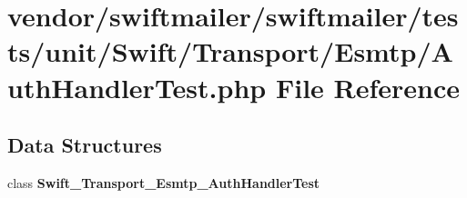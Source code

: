 \section{vendor/swiftmailer/swiftmailer/tests/unit/\+Swift/\+Transport/\+Esmtp/\+Auth\+Handler\+Test.php File Reference}
\label{_auth_handler_test_8php}
\subsection*{Data Structures}
\begin{DoxyCompactItemize}
\item 
class {\bf Swift\+\_\+\+Transport\+\_\+\+Esmtp\+\_\+\+Auth\+Handler\+Test}
\end{DoxyCompactItemize}
